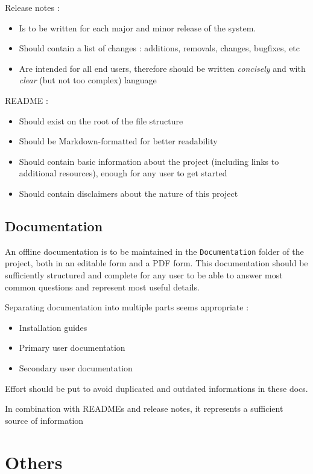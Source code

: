 \documentclass[11pt]{article}
\begin{document}
Release notes :
\begin{itemize}
	\item Is to be written for each major and minor release of the system.
	\item Should contain a list of changes : additions, removals, changes, bugfixes, etc
	\item Are intended for all end users, therefore should be written \textit{concisely} and with \textit{clear} (but not too complex) language
\end{itemize}

README :
\begin{itemize}
	\item Should exist on the root of the file structure
	\item Should be Markdown-formatted for better readability
	\item Should contain basic information about the project (including links to additional resources), enough for any user to get started
	\item Should contain disclaimers about the nature of this project
\end{itemize}



\subsection{Documentation}

An offline documentation is to be maintained in the \verb|Documentation| folder of the project, both in an editable form and a PDF form. This documentation should be sufficiently structured and complete for any user to be able to answer most common questions and represent most useful details.

Separating documentation into multiple parts seems appropriate :
\begin{itemize}
	\item Installation guides
	\item Primary user documentation
	\item Secondary user documentation
\end{itemize}

Effort should be put to avoid duplicated and outdated informations in these docs.

In combination with READMEs and release notes, it represents a sufficient source of information

\newpage
\section{Others}
\end{document}
